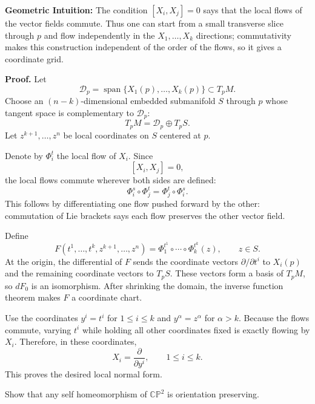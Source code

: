 \begin{solution}
\textbf{Geometric Intuition:} The condition $[X_i,X_j]=0$ says that the local flows of the vector fields commute. Thus one can start from a small transverse slice through $p$ and flow independently in the $X_1,\dots,X_k$ directions; commutativity makes this construction independent of the order of the flows, so it gives a coordinate grid.

\textbf{Proof.}
Let
\[
\mathcal{D}_p=\operatorname{span}\{X_1(p),\dots,X_k(p)\}\subset T_pM.
\]
Choose an $(n-k)$-dimensional embedded submanifold $S$ through $p$ whose tangent space is complementary to $\mathcal{D}_p$:
\[
T_pM=\mathcal{D}_p\oplus T_pS.
\]
Let $z^{k+1},\dots,z^n$ be local coordinates on $S$ centered at $p$.

Denote by $\Phi_i^t$ the local flow of $X_i$. Since
\[
[X_i,X_j]=0,
\]
the local flows commute wherever both sides are defined:
\[
\Phi_i^s\circ\Phi_j^t=\Phi_j^t\circ\Phi_i^s.
\]
This follows by differentiating one flow pushed forward by the other: commutation of Lie brackets says each flow preserves the other vector field.

Define
\[
F(t^1,\dots,t^k,z^{k+1},\dots,z^n)
=
\Phi_1^{t^1}\circ\cdots\circ\Phi_k^{t^k}(z),
\qquad z\in S.
\]
At the origin, the differential of $F$ sends the coordinate vectors $\partial/\partial t^i$ to $X_i(p)$ and the remaining coordinate vectors to $T_pS$. These vectors form a basis of $T_pM$, so $dF_0$ is an isomorphism. After shrinking the domain, the inverse function theorem makes $F$ a coordinate chart.

Use the coordinates $y^i=t^i$ for $1\leq i\leq k$ and $y^\alpha=z^\alpha$ for $\alpha>k$. Because the flows commute, varying $t^i$ while holding all other coordinates fixed is exactly flowing by $X_i$. Therefore, in these coordinates,
\[
X_i=\frac{\partial}{\partial y^i},
\qquad 1\leq i\leq k.
\]
This proves the desired local normal form.
\end{solution}

\clearpage

\begin{exercise}
\label{geometry:2012:3}
Show that any self homeomorphism of $\mathbb{CP}^{2}$ is orientation preserving.
\end{exercise}

